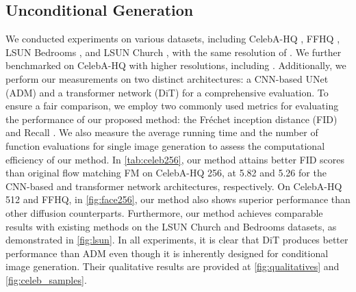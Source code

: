 \documentclass{article}
\theoremstyle{plain}
\theoremstyle{definition}
\theoremstyle{remark}
\begin{document}
\subsection{Unconditional Generation}
We conducted experiments on various datasets, including CelebA-HQ \cite{karras2017progressive}, FFHQ \cite{karras2019style}, LSUN Bedrooms \cite{yu2015lsun}, and LSUN Church \cite{yu2015lsun}, with the same resolution of . We further benchmarked on CelebA-HQ with higher resolutions, including . Additionally, we perform our measurements on two distinct architectures: a CNN-based UNet (ADM) \cite{dhariwal2021diffusion} and a transformer network (DiT) \cite{Peebles2022DiT} for a comprehensive evaluation. To ensure a fair comparison, we employ two commonly used metrics for evaluating the performance of our proposed method: the Fréchet inception distance (FID) \cite{heusel2017gans} and Recall \cite{kynkaanniemi2019improved}. We also measure the average running time and the number of function evaluations for single image generation to assess the computational efficiency of our method. In \cref{tab:celeb256}, our method attains better FID scores than original flow matching FM on CelebA-HQ 256, at 5.82 and 5.26 for the CNN-based and transformer network architectures, respectively. On CelebA-HQ 512 and FFHQ, in \cref{fig:face256}, our method also shows superior performance than other diffusion counterparts. Furthermore, our method achieves comparable results with existing methods on the LSUN Church and Bedrooms datasets, as demonstrated in  \cref{fig:lsun}. In all experiments, it is clear that DiT produces better performance than ADM even though it is inherently designed for conditional image generation. Their qualitative results are provided at \cref{fig:qualitatives} and \cref{fig:celeb_samples}.
\end{document}
